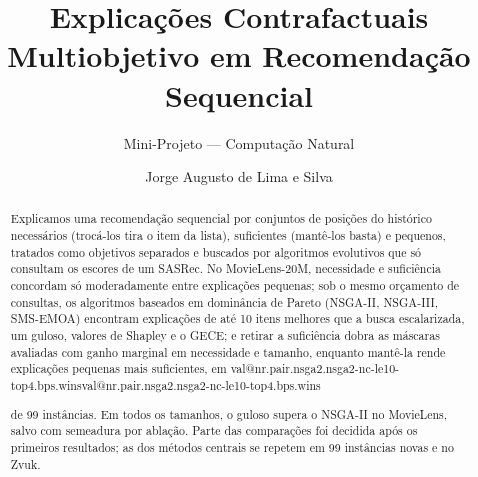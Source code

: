 \documentclass[sigconf,nonacm]{acmart}
\makeatletter
\newcommand{\val}[1]{\ifcsname val@#1\endcsname\csname val@#1\endcsname\else
  \PackageError{numeros}{valor '#1' nao definido em tabelas/numeros.tex}{}\fi}
\makeatother
\begin{document}
\title{Explicações Contrafactuais Multiobjetivo em Recomendação Sequencial}
\subtitle{Mini-Projeto --- Computação Natural}

\author{Jorge Augusto de Lima e Silva}

\begin{abstract}
Explicamos uma recomendação sequencial por conjuntos de posições do histórico
necessários (trocá-los tira o item da lista), suficientes (mantê-los basta) e
pequenos, tratados como objetivos separados e buscados por algoritmos
evolutivos que só consultam os escores de um SASRec. No MovieLens-20M,
necessidade e suficiência concordam só moderadamente entre explicações
pequenas; sob o mesmo orçamento de consultas, os algoritmos baseados em
dominância de Pareto (NSGA-II, NSGA-III, SMS-EMOA) encontram explicações de até
10 itens melhores que a busca escalarizada, um guloso, valores de Shapley e o
GECE; e retirar a suficiência dobra as máscaras avaliadas com ganho marginal
em necessidade e tamanho, enquanto mantê-la rende explicações pequenas mais
suficientes, em \val{nr.pair.nsga2.nsga2-nc-le10-top4.bps.wins} de 99 instâncias. Em todos os
tamanhos, o guloso supera o NSGA-II no MovieLens, salvo com semeadura por
ablação. Parte das comparações foi decidida após os primeiros resultados; as
dos métodos centrais se repetem em 99 instâncias novas e no Zvuk.
\end{abstract}

\maketitle












\appendix

\end{document}
